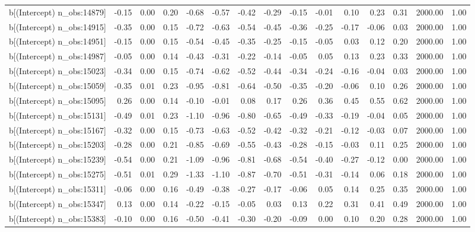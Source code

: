 \begin{table}[ht]
\begin{tabular}{rrrrrrrrrrrrrrr}
  b[(Intercept) n\_obs:14879] & -0.15 & 0.00 & 0.20 & -0.68 & -0.57 & -0.42 & -0.29 & -0.15 & -0.01 & 0.10 & 0.23 & 0.31 & 2000.00 & 1.00 \\ 
  b[(Intercept) n\_obs:14915] & -0.35 & 0.00 & 0.15 & -0.72 & -0.63 & -0.54 & -0.45 & -0.36 & -0.25 & -0.17 & -0.06 & 0.03 & 2000.00 & 1.00 \\ 
  b[(Intercept) n\_obs:14951] & -0.15 & 0.00 & 0.15 & -0.54 & -0.45 & -0.35 & -0.25 & -0.15 & -0.05 & 0.03 & 0.12 & 0.20 & 2000.00 & 1.00 \\ 
  b[(Intercept) n\_obs:14987] & -0.05 & 0.00 & 0.14 & -0.43 & -0.31 & -0.22 & -0.14 & -0.05 & 0.05 & 0.13 & 0.23 & 0.33 & 2000.00 & 1.00 \\ 
  b[(Intercept) n\_obs:15023] & -0.34 & 0.00 & 0.15 & -0.74 & -0.62 & -0.52 & -0.44 & -0.34 & -0.24 & -0.16 & -0.04 & 0.03 & 2000.00 & 1.00 \\ 
  b[(Intercept) n\_obs:15059] & -0.35 & 0.01 & 0.23 & -0.95 & -0.81 & -0.64 & -0.50 & -0.35 & -0.20 & -0.06 & 0.10 & 0.26 & 2000.00 & 1.00 \\ 
  b[(Intercept) n\_obs:15095] & 0.26 & 0.00 & 0.14 & -0.10 & -0.01 & 0.08 & 0.17 & 0.26 & 0.36 & 0.45 & 0.55 & 0.62 & 2000.00 & 1.00 \\ 
  b[(Intercept) n\_obs:15131] & -0.49 & 0.01 & 0.23 & -1.10 & -0.96 & -0.80 & -0.65 & -0.49 & -0.33 & -0.19 & -0.04 & 0.05 & 2000.00 & 1.00 \\ 
  b[(Intercept) n\_obs:15167] & -0.32 & 0.00 & 0.15 & -0.73 & -0.63 & -0.52 & -0.42 & -0.32 & -0.21 & -0.12 & -0.03 & 0.07 & 2000.00 & 1.00 \\ 
  b[(Intercept) n\_obs:15203] & -0.28 & 0.00 & 0.21 & -0.85 & -0.69 & -0.55 & -0.43 & -0.28 & -0.15 & -0.03 & 0.11 & 0.25 & 2000.00 & 1.00 \\ 
  b[(Intercept) n\_obs:15239] & -0.54 & 0.00 & 0.21 & -1.09 & -0.96 & -0.81 & -0.68 & -0.54 & -0.40 & -0.27 & -0.12 & 0.00 & 2000.00 & 1.00 \\ 
  b[(Intercept) n\_obs:15275] & -0.51 & 0.01 & 0.29 & -1.33 & -1.10 & -0.87 & -0.70 & -0.51 & -0.31 & -0.14 & 0.06 & 0.18 & 2000.00 & 1.00 \\ 
  b[(Intercept) n\_obs:15311] & -0.06 & 0.00 & 0.16 & -0.49 & -0.38 & -0.27 & -0.17 & -0.06 & 0.05 & 0.14 & 0.25 & 0.35 & 2000.00 & 1.00 \\ 
  b[(Intercept) n\_obs:15347] & 0.13 & 0.00 & 0.14 & -0.22 & -0.15 & -0.05 & 0.03 & 0.13 & 0.22 & 0.31 & 0.41 & 0.49 & 2000.00 & 1.00 \\ 
  b[(Intercept) n\_obs:15383] & -0.10 & 0.00 & 0.16 & -0.50 & -0.41 & -0.30 & -0.20 & -0.09 & 0.00 & 0.10 & 0.20 & 0.28 & 2000.00 & 1.00 \\ 

\end{tabular}
\end{table}
